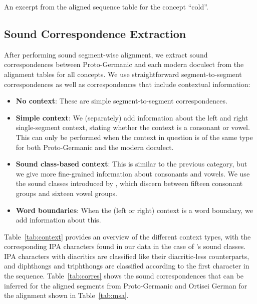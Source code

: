 \documentclass[a4paper]{article}
\begin{document}
\begin{table}[h]
\begin{center}

\end{center}
\caption{An excerpt from the aligned sequence table for the concept ``cold''.}
\label{tab:msa}
\end{table}

\subsection{Sound Correspondence Extraction}
\label{subsec:corres}

After performing sound segment-wise alignment,
we extract sound correspondences between
Proto-Germanic and each modern doculect from the alignment tables for all concepts.
We use straightforward segment-to-segment correspondences
as well as correspondences that include contextual information:

\begin{itemize}
\item
\textbf{No context}:
These are simple segment-to-segment correspondences.

\item
\textbf{Simple context}:
We (separately) add information about the
left and right single-segment context,
stating whether the context is a consonant or vowel. 
This can only be performed when the context in question is of
the same type for both Proto-Germanic and the modern doculect.

\item
\textbf{Sound class-based context}:
This is similar to the previous category,
but we give more fine-grained information about consonants and vowels.
We use the sound classes introduced by \citet{list2012sca},
which discern between fifteen consonant groups and
sixteen vowel groups.

\item
\textbf{Word boundaries}:
When the (left or right) context is a word boundary,
we add information about this.

\end{itemize}

Table~\ref{tab:context} provides an overview
of the different context types,
with the corresponding IPA characters found in our data
in the case of \citeauthor{list2012sca}'s sound classes.
IPA characters with diacritics are classified
like their diacritic-less counterparts,
and diphthongs and triphthongs are classified
according to the first character in the sequence.
Table~\ref{tab:corres} shows the sound correspondences
that can be inferred for the aligned segments
from Proto-Germanic and Ortisei German for the alignment
shown in Table~\ref{tab:msa}.
\end{document}
